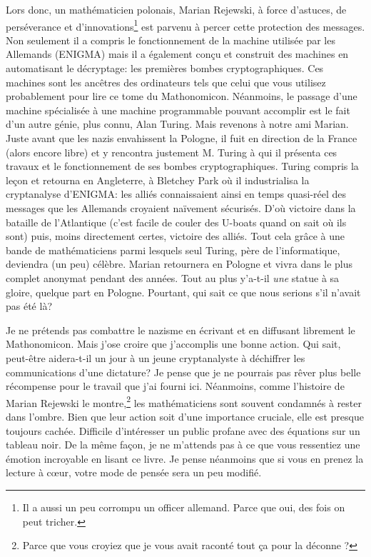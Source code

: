 Lors donc, un mathématicien polonais, Marian Rejewski, à force
d'astuces, de perséverance et d'innovations\footnote{Il a aussi un peu
corrompu un officer allemand. Parce que oui, des fois on peut
tricher.}  est parvenu à percer cette protection des messages. Non
seulement il a compris le fonctionnement de la machine utilisée par
les Allemands (ENIGMA) mais il a également conçu et construit des
machines en automatisant le décryptage: les premières bombes
cryptographiques. Ces machines sont les ancêtres des ordinateurs tels
que celui que vous utilisez probablement pour lire ce tome du
Mathonomicon. Néanmoins, le passage d'une machine spécialisée à une
machine programmable pouvant accomplir est le fait d'un autre génie,
plus connu, Alan Turing. Mais revenons à notre ami Marian. Juste avant
que les nazis envahissent la Pologne, il fuit en direction de la
France (alors encore libre) et y rencontra justement M. Turing à qui
il présenta ces travaux et le fonctionnement de ses bombes
cryptographiques. Turing compris la leçon et retourna en Angleterre, à
Bletchey Park où il industrialisa la cryptanalyse d'ENIGMA: les alliés
connaissaient ainsi en temps quasi-réel des messages que les Allemands
croyaient naïvement sécurisés. D'où victoire dans la bataille de
l'Atlantique (c'est facile de couler des U-boats quand on sait où ils
sont) puis, moins directement certes, victoire des alliés. Tout cela
grâce à une bande de mathématiciens parmi lesquels seul Turing, père
de l'informatique, deviendra (un peu) célèbre. Marian retournera en
Pologne et vivra dans le plus complet anonymat pendant des
années. Tout au plus y'a-t-il \emph{une} statue à sa gloire, quelque
part en Pologne. Pourtant, qui sait ce que nous serions s'il n'avait
pas été là?

Je ne prétends pas combattre le nazisme en écrivant et en diffusant
librement le Mathonomicon. Mais j'ose croire que j'accomplis une bonne
action. Qui sait, peut-être aidera-t-il un jour à un jeune
cryptanalyste à déchiffrer les communications d'une dictature? Je
pense que je ne pourrais pas rêver plus belle récompense pour le
travail que j'ai fourni ici.  Néanmoins, comme l'histoire de Marian
Rejewski le montre,\footnote{Parce que vous croyiez que je vous avait
  raconté tout ça pour la déconne ?} les mathématiciens sont souvent
condamnés à rester dans l'ombre. Bien que leur action soit d'une
importance cruciale, elle est presque toujours cachée. Difficile
d'intéresser un public profane avec des équations sur un tableau
noir. De la même façon, je ne m'attends pas à ce que vous ressentiez
une émotion incroyable en lisant ce livre. Je pense néanmoins que si
vous en prenez la lecture à cœur, votre mode de pensée sera un peu
modifié.

